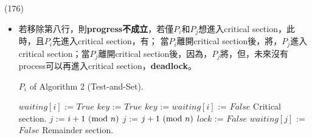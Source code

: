 \begin{theorem}{(176)}
\begin{itemize}
\begin{itemize}
\begin{lstlisting}[caption={Shared variables of Algorithm 2 (\textsc{Test-and-Set}).}, captionpos=b, mathescape=true]
                bool lock = $False$;
                /*
                True，表示想進但在等；
                False，表示已在critical section或是初值。
                */
                bool waiting[$0 \ \cdots \ (n - 1)$] = $False$;
            \end{lstlisting}
            \item 若移除第八行，則\textbf{progress不成立}，若僅$P_i$和$P_j$想進入critical section，此時，且$P_i$先進入critical section，有；
            當$P_i$離開critical section後，將，$P_j$進入critical section；當$P_j$離開critical section後，因為，$P_j$將，但，未來沒有process可以再進入critical section，\textbf{deadlock}。
            \begin{algorithm}[H]
                \caption{$P_i$ of Algorithm 2 (Test-and-Set).}
                \label{algo:test-and-set-algo-2}
                \begin{algorithmic}[1]
                        \Repeat
                            \State $waiting[i]$ := $True$
                            \State $key$ := $True$ 
                                \State $key$ := 
                            \EndWhile
                            \State $waiting[i]$ := $False$
                            \State Critical section.
                            \State $j$ := $i + 1 \ (\mathrm{mod}\ n)$
                             
                                \State $j$ := $j + 1 \ (\mathrm{mod}\ n)$
                            \EndWhile
                             
                                \State $lock$ := $False$
                            \Else 
                                \State $waiting[j]$ := $False$
                            \EndIf
                            \State Remainder section.
                    \EndFunction
                \end{algorithmic}
            \end{algorithm}
        \end{itemize}
    \end{itemize}
\end{theorem}

